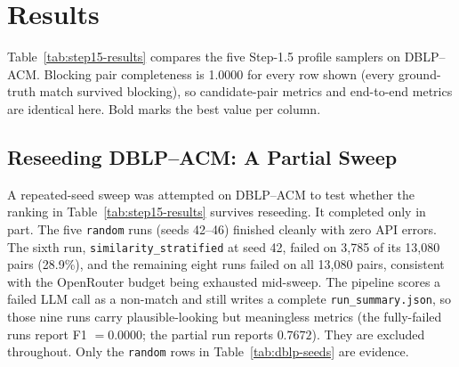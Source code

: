 \documentclass[11pt]{article}
\begin{document}
\section{Results}
\label{sec:results}

Table~\ref{tab:step15-results} compares the five Step-1.5 profile samplers on
DBLP--ACM. Blocking pair completeness is 1.0000 for every row shown (every
ground-truth match survived blocking), so candidate-pair metrics and end-to-end
metrics are identical here. Bold marks the best value per column.

\begin{table}[htbp]
\centering
\small
{}
\caption{Step-1.5 profile-sampler comparison on DBLP--ACM, current pipeline
(\texttt{BAAI/bge-large-en-v1.5} + \texttt{google/gemini-2.5-flash}). Single run per
sampler at seed 42. Section~\ref{sec:dblp-seeds} shows that this single-seed ranking
is not reliable.}
\label{tab:step15-results}
\end{table}

\subsection{Reseeding DBLP--ACM: A Partial Sweep}
\label{sec:dblp-seeds}

A repeated-seed sweep was attempted on DBLP--ACM to test whether the ranking in
Table~\ref{tab:step15-results} survives reseeding. It completed only in part. The
five \texttt{random} runs (seeds 42--46) finished cleanly with zero API errors. The
sixth run, \texttt{similarity\_stratified} at seed 42, failed on 3{,}785 of its
13{,}080 pairs (28.9\%), and the remaining eight runs failed on all 13{,}080 pairs,
consistent with the OpenRouter budget being exhausted mid-sweep. The pipeline scores
a failed LLM call as a non-match and still writes a complete
\texttt{run\_summary.json}, so those nine runs carry plausible-looking but
meaningless metrics (the fully-failed runs report F1 $=0.0000$; the partial run
reports $0.7672$). They are excluded throughout. Only the \texttt{random} rows in
Table~\ref{tab:dblp-seeds} are evidence.
\end{document}
